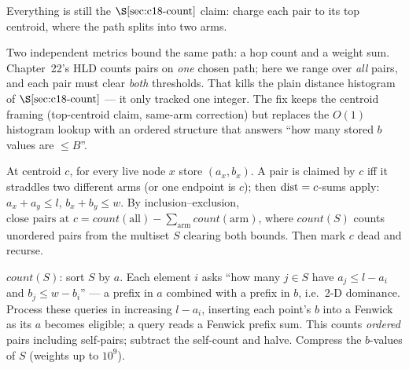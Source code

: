 \begin{attemptgate}
Everything is still the \(\secref{c18-count}\) claim: charge each pair to its top
centroid, where the path splits into two arms.  
\end{attemptgate}

Two independent metrics bound the same path: a hop count and a weight sum. Chapter~22's
HLD counts pairs on \emph{one} chosen path; here we range over \emph{all} pairs, and each
pair must clear \emph{both} thresholds. That kills the plain distance histogram of
\(\secref{c18-count}\) --- it only tracked one integer. The fix keeps the centroid
framing (top-centroid claim, same-arm correction) but replaces the \(O(1)\) histogram
lookup with an ordered structure that answers ``how many stored \(b\) values are \(\le
B\)''.

At centroid \(c\), for every live node \(x\) store \((a_x,b_x)\). A pair is claimed by
\(c\) iff it straddles two different arms (or one endpoint is \(c\)); then
\(\operatorname{dist}=c\)-sums apply: \(a_x+a_y\le l\), \(b_x+b_y\le w\). By inclusion--exclusion,
\(\text{close pairs at }c=\mathit{count}(\text{all})-\sum_{\text{arm}}\mathit{count}(\text{arm})\),
where \(\mathit{count}(S)\) counts unordered pairs from the multiset \(S\) clearing both
bounds. Then mark \(c\) dead and recurse.

\(\mathit{count}(S)\): sort \(S\) by \(a\). Each element \(i\) asks ``how many \(j\in S\)
have \(a_j\le l-a_i\) and \(b_j\le w-b_i\)'' --- a prefix in \(a\) combined with a prefix
in \(b\), i.e.\ 2-D dominance. Process these queries in increasing \(l-a_i\), inserting
each point's \(b\) into a Fenwick as its \(a\) becomes eligible; a query reads a Fenwick
prefix sum. This counts \emph{ordered} pairs including self-pairs; subtract the self-count
and halve. Compress the \(b\)-values of \(S\) (weights up to \(10^9\)).

